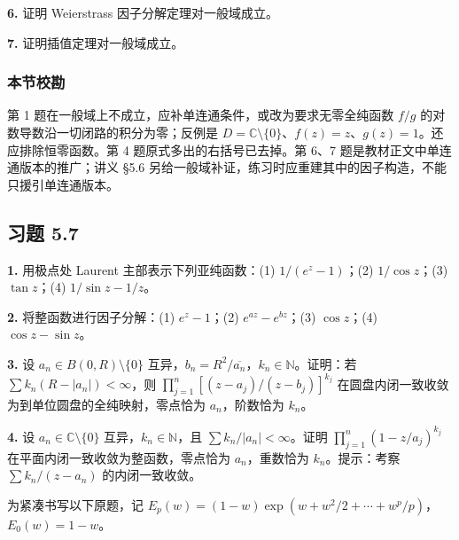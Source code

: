 \documentclass[11pt,a4paper]{article}
\begin{document}
\par{}
\noindent\textbf{6.} 证明 Weierstrass 因子分解定理对一般域成立。

\par{}
\noindent\textbf{7.} 证明插值定理对一般域成立。

\subsubsection{本节校勘}\label{ch05-practice-ux672cux8282ux6821ux52d8-4}

第 1 题在一般域上不成立，应补单连通条件，或改为要求无零全纯函数 \(f/g\)
的对数导数沿一切闭路的积分为零；反例是
\(D=\mathbb C\setminus\{0\}\)、\(f(z)=z\)、\(g(z)=1\)。还应排除恒零函数。第
4 题原式多出的右括号已去掉。第 6、7 题是教材正文中单连通版本的推广；讲义
§5.6 另给一般域补证，练习时应重建其中的因子构造，不能只援引单连通版本。

\subsection{习题 5.7}\label{ch05-practice-heading-7}

\par{}
\noindent\textbf{1.} 用极点处 Laurent 主部表示下列亚纯函数：(1)
\(1/(e^z-1)\)；(2) \(1/\cos z\)；(3) \(\tan z\)；(4) \(1/\sin z-1/z\)。

\par{}
\noindent\textbf{2.} 将整函数进行因子分解：(1) \(e^z-1\)；(2)
\(e^{az}-e^{bz}\)；(3) \(\cos z\)；(4) \(\cos z-\sin z\)。

\par{}
\noindent\textbf{3.} 设 \(a_n\in B(0,R)\setminus\{0\}\)
互异，\(b_n=R^2/\overline{a_n}\)，\(k_n\in\mathbb N\)。证明：若
\(\sum k_n(R-|a_n|)<\infty\)，则
\(\prod_{j=1}^n[(z-a_j)/(z-b_j)]^{k_j}\)
在圆盘内闭一致收敛为到单位圆盘的全纯映射，零点恰为 \(a_n\)，阶数恰为
\(k_n\)。

\par{}
\noindent\textbf{4.} 设 \(a_n\in\mathbb C\setminus\{0\}\)
互异，\(k_n\in\mathbb N\)，且 \(\sum k_n/|a_n|<\infty\)。证明
\(\prod_{j=1}^n(1-z/a_j)^{k_j}\) 在平面内闭一致收敛为整函数，零点恰为
\(a_n\)，重数恰为 \(k_n\)。提示：考察 \(\sum k_n/(z-a_n)\)
的内闭一致收敛。

为紧凑书写以下原题，记
\(E_p(w)=(1-w)\exp(w+w^2/2+\cdots+w^p/p)\)，\(E_0(w)=1-w\)。
\end{document}
